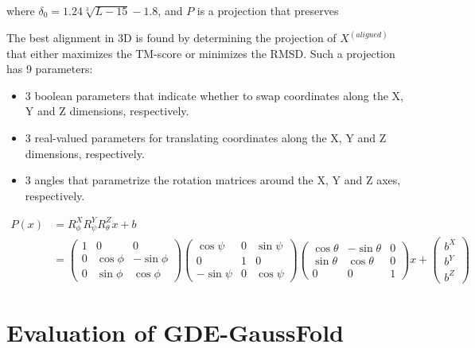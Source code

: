     where $\delta_0 = 1.24 \sqrt[3]{L - 15} - 1.8$, and $P$ is a projection that preserves

    The best alignment in 3D is found by determining the projection of $X^{(aligned)}$ that
    either maximizes the TM-score or minimizes the RMSD.
    Such a projection has 9 parameters:
    \begin{itemize}
        \item 3 boolean parameters that indicate whether to swap coordinates along
        the X, Y and Z dimensions, respectively.
        \item 3 real-valued parameters for translating coordinates along the X, Y and Z
        dimensions, respectively.
        \item 3 angles that parametrize the rotation matrices around the X, Y and Z axes,
        respectively.
    \end{itemize}

    \begin{align*}
        P(x) & = R^X_{\phi} R^Y_{\psi} R^Z_{\theta} x + b \\
        & =
        \begin{pmatrix}
        1 & 0 & 0 \\
        0 & \cos{\phi} & -\sin{\phi} \\
        0 & \sin{\phi} & \cos{\phi}
        \end{pmatrix}
        \begin{pmatrix}
        \cos{\psi} & 0 & \sin{\psi} \\
        0 & 1 & 0 \\
        -\sin{\psi} & 0 & \cos{\psi}
        \end{pmatrix}
        \begin{pmatrix}
        \cos{\theta} & -\sin{\theta} & 0 \\
        \sin{\theta} & \cos{\theta} & 0 \\
        0 & 0 & 1
        \end{pmatrix}
        x +
        \begin{pmatrix}
        b^X \\
        b^Y \\
        b^Z
        \end{pmatrix}
    \end{align*}

\section{Evaluation of GDE-GaussFold}

